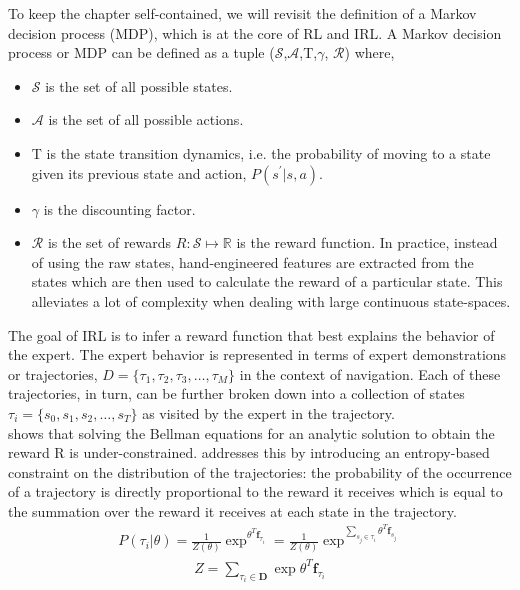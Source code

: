 To keep the chapter self-contained, we will revisit the definition of a Markov decision process (MDP), which is at the core of RL and IRL.
A Markov decision process or MDP can be defined as a tuple ($\mathcal{S}$,$\mathcal{A}$,T,$\gamma$, $\mathcal{R}$)  where,
\begin{itemize}
    \item $\mathcal{S}$ is the set of all possible states.
    \item $\mathcal{A}$ is the set of all possible actions.
    \item T is the state transition dynamics, i.e. the probability of moving to a state given its previous state and action, $P(s^{'}|s, a)$.
    \item $\gamma$ is the discounting factor.
    \item $\mathcal{R}$ is the set of rewards $R:  \mathcal{S} \mapsto \mathbb{R} $ is the reward function. In practice, instead of using the raw states, hand-engineered features are extracted from the states which are then used to calculate the reward of a particular state. This alleviates a lot of complexity when dealing with large continuous state-spaces. 
    \end{itemize}  
The goal of IRL is to infer a reward function that best explains the behavior of the expert. The expert behavior is represented in terms of expert demonstrations or trajectories, $D = \{ \tau_1, \tau_2, \tau_3, \dots, 
\tau_{M} \}$ in the context of navigation. Each of these trajectories, in turn, can be further broken down into a collection of states $\tau_{i} = \{ s_{0}, s_{1}, s_{2}, \dots, s_{T} \}$ as visited by the expert in the trajectory. \\
\cite{abbeel_apprenticeshiplearning_2004} shows that solving the Bellman equations for an analytic solution to obtain the reward R is under-constrained. \cite{ziebart_maxent_2008} addresses this by introducing an entropy-based constraint \cite{jaynes1957information} on the distribution of the trajectories: the probability of the occurrence of a trajectory is directly proportional to the reward it receives which is equal to the summation over the reward it receives at each state in the trajectory.
\begin{align}
P(\tau_{i}| \theta) = \frac{1}{Z(\theta)}\exp^{\theta^{T}\mathbf{f}_{\tau_{i}}} = \frac{1}{Z(\theta)}\exp^{\sum_{s_{j}\in\tau_{i}}\theta^{T}\mathbf{f}_{s_{j}}}
\end{align}
\begin{align}
Z = \sum_{\tau_{i}\in \mathbf{D}}\exp{\theta^{T}\mathbf{f}_{\tau_{i}}}
\end{align}
